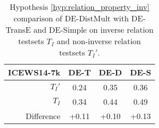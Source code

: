 \begin{table}[htb]
\centering
\begin{minipage}{\columnwidthcaption}
\centering
\caption{Hypothesis \autoref{hyp:relation_property_inv} comparison of DE-DistMult with DE-TransE and DE-Simple on inverse relation testsets $T_I$ and non-inverse relation testsets $T_I'$.}
\vspace{-3mm}

\begin{tabular}{r|ccc}\hline
\mbox{ICEWS14-7k} & DE-T & DE-D & DE-S \\ \hline
$T_I'$ & 0.24 & 0.35 & 0.36 \\
$T_I$ & 0.34 & 0.44 & 0.49 \\ \hline
Difference & +0.11 & +0.10 & +0.13 \\
 \hline
\end{tabular}

\label{tab:hypothesis_3_c_comparison}
\end{minipage}
\end{table}

